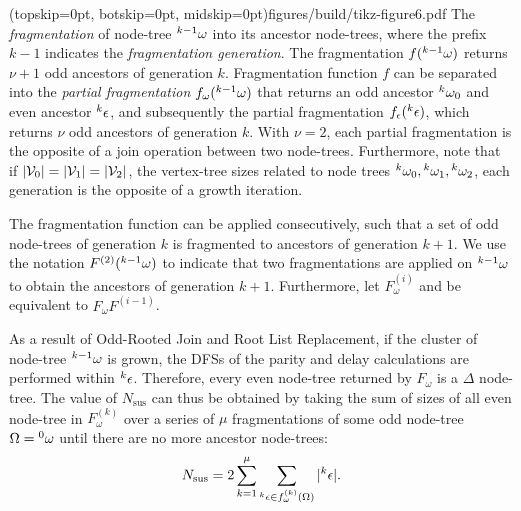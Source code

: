 \Figure[hbt](topskip=0pt, botskip=0pt, midskip=0pt){figures/build/tikz-figure6.pdf}{
  The \emph{fragmentation} of node-tree ${}^{k-1}\omega$ into its ancestor node-trees, where the prefix $k-1$ indicates the \emph{fragmentation generation}. The fragmentation $f({}^{k-1}\omega)$ returns $\nu+1$ odd ancestors of generation $k$. Fragmentation function $f$ can be separated into the \emph{partial fragmentation} $f_\omega({}^{k-1}\omega)$ that returns an odd ancestor ${}^{k}\omega_0$ and even ancestor ${}^{k}\epsilon$, and subsequently the partial fragmentation $f_\epsilon({}^{k}\epsilon)$, which returns $\nu$ odd ancestors of generation $k$. With $\nu=2$, each partial fragmentation is the opposite of a join operation between two node-trees. Furthermore, note that if $\lvert\mathcal{V}_0\rvert = \lvert\mathcal{V}_1\rvert = \lvert\mathcal{V}_2\rvert$, the vertex-tree sizes related to node trees ${}^{k}\omega_0, {}^{k}\omega_1, {}^{k}\omega_2$, each generation is the opposite of a growth iteration. \label{fig6}}


The fragmentation function can be applied consecutively, such that a set of odd node-trees of generation $k$ is fragmented to ancestors of generation $k+1$. We use the notation $F^{(2)}({}^{k-1}\omega)$ to indicate that two fragmentations are applied on ${}^{k-1}\omega$ to obtain the ancestors of generation $k+1$. Furthermore, let $F_\omega^{(i)}$ and be equivalent to $F_\omega F^{(i-1)}$. 

As a result of Odd-Rooted Join and Root List Replacement, if the cluster of node-tree ${}^{k-1}\omega$ is grown, the DFSs of the parity and delay calculations are performed within ${}^{k}\epsilon$. Therefore, every even node-tree returned by $F_\omega$ is a $\Delta$ node-tree. The value of $N_{\text{sus}}$ can thus be obtained by taking the sum of sizes of all even node-tree in $F_\omega^{(k)}$ over a series of $\mu$ fragmentations of some odd node-tree $\Omega = {}^{0}\omega$ until there are no more ancestor node-trees:
\begin{equation}\label{eq:npdc}
  N_{\text{sus}} = 2\sum_{k=1}^\mu{ \sum_{  {}^{k} \epsilon \in f_\omega^{(k)}(\Omega) }{ \lvert {}^{k} \epsilon\rvert} }.
\end{equation}

